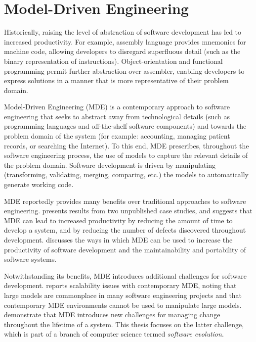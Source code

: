 
\section{Model-Driven Engineering}
Historically, raising the level of abstraction of software development has led to increased productivity. For example, assembly language provides mnemonics for machine code, allowing developers to disregard superfluous detail (such as the binary representation of instructions). Object-orientation and functional programming permit further abstraction over assembler, enabling developers to express solutions in a manner that is more representative of their problem domain.

Model-Driven Engineering (MDE) is a contemporary approach to software engineering that seeks to abstract away from technological details (such as programming languages and off-the-shelf software components) and towards the problem domain of the system (for example: accounting, managing patient records, or searching the Internet). To this end, MDE prescribes, throughout the software engineering process, the use of models to capture the relevant details of the problem domain. Software development is driven by manipulating (transforming, validating, merging, comparing, etc.) the models to automatically generate working code.

MDE reportedly provides many benefits over traditional approaches to software engineering. \cite{watson08mdahistory} presents results from two unpublished case studies, and suggests that MDE can lead to increased productivity by reducing the amount of time to develop a system, and by reducing the number of defects discovered throughout development. \cite{kleppe03mda} discusses the ways in which MDE can be used to increase the productivity of software development and the maintainability and portability of software systems.

Notwithstanding its benefits, MDE introduces additional challenges for software development. \cite{kolovos08scalability} reports scalability issues with contemporary MDE, noting that large models are commonplace in many software engineering projects and that contemporary MDE environments cannot be used to manipulate large models. \cite{Mens07} demonstrate that MDE introduces new challenges for managing change throughout the lifetime of a system. This thesis focuses on the latter challenge, which is part of a branch of computer science termed \emph{software evolution}.

